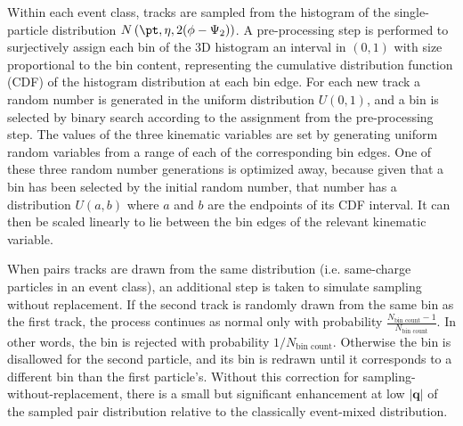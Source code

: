 Within each event class, tracks are sampled from the histogram of the single-particle distribution $N \left( \pt, \eta, 2(\phi-\psit) \right) $.
A pre-processing step is performed to surjectively assign each bin of the 3D histogram an interval in $(0,1)$ with size proportional to the bin content, representing the cumulative distribution function (CDF) of the histogram distribution at each bin edge.
For each new track a random number is generated in the uniform distribution $U(0,1)$, and a bin is selected by binary search according to the assignment from the pre-processing step.
The values of the three kinematic variables are set by generating uniform random variables from a range of each of the corresponding bin edges.
One of these three random number generations is optimized away, because given that a bin has been selected by the initial random number, that number has a distribution $U(a, b)$ where $a$ and $b$ are the endpoints of its CDF interval.
It can then be scaled linearly to lie between the bin edges of the relevant kinematic variable.

When pairs tracks are drawn from the same distribution (i.e. same-charge particles in an event class), an additional step is taken to simulate sampling without replacement.
If the second track is randomly drawn from the same bin as the first track, the process continues as normal only with probability $\frac{N_\textrm{bin count} - 1}{N_\textrm{bin count}}$.
In other words, the bin is rejected with probability $1/N_\textrm{bin count}$.
Otherwise the bin is disallowed for the second particle, and its bin is redrawn until it corresponds to a different bin than the first particle's.
Without this correction for sampling-without-replacement, there is a small but significant enhancement at low $|\mathbf{q}|$ of the sampled pair distribution relative to the classically event-mixed distribution.

